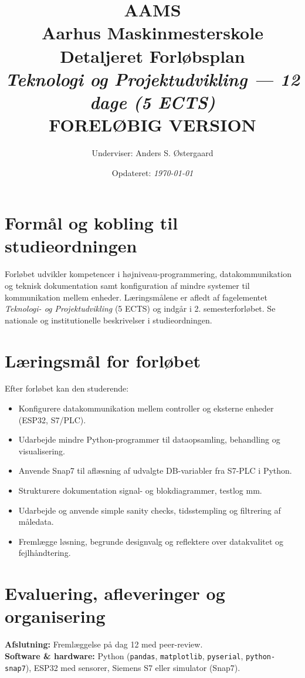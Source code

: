 \documentclass[a4paper,11pt]{article}
\title{\textbf{\Huge AAMS}\\[0.5cm]
       {\Large Aarhus Maskinmesterskole}\\[1cm]
       {\huge\color{blue!70!black}Detaljeret Forløbsplan}\\[0.3cm]
       {\Large\color{red!70!black}\textit{Teknologi og Projektudvikling — 12 dage (5 ECTS)}}\\[0.5cm]
       {\large\color{gray}\textbf{FORELØBIG VERSION}}}
\author{Underviser: Anders S. Østergaard}
\date{Opdateret: \emph{\today}}
\begin{document}
\maketitle

\tableofcontents
\clearpage

\section*{Formål og kobling til studieordningen}
Forløbet udvikler kompetencer i højniveau-programmering, datakommunikation og teknisk dokumentation samt konfiguration af mindre systemer til kommunikation mellem enheder. Læringsmålene er afledt af fagelementet \emph{Teknologi- og Projektudvikling} (5 ECTS) og indgår i 2. semesterforløbet. Se nationale og institutionelle beskrivelser i studieordningen.

\section*{Læringsmål for forløbet}
Efter forløbet kan den studerende:
\begin{itemize}
  \item Konfigurere datakommunikation mellem controller og eksterne enheder (ESP32, S7/PLC).
  \item Udarbejde mindre Python-programmer til dataopsamling, behandling og visualisering.
  \item Anvende Snap7 til aflæsning af udvalgte DB-variabler fra S7-PLC i Python.
  \item Strukturere dokumentation signal- og blokdiagrammer, testlog mm.
  \item Udarbejde og anvende simple sanity checks, tidsstempling og filtrering af måledata.
  \item Fremlægge løsning, begrunde designvalg og reflektere over datakvalitet og fejlhåndtering.
\end{itemize}

\section*{Evaluering, afleveringer og organisering}
\textbf{Afslutning:} Fremlæggelse på dag 12 med peer-review. \\
\textbf{Software \& hardware:} Python (\texttt{pandas}, \texttt{matplotlib}, \texttt{pyserial}, \texttt{python-snap7}), ESP32 med sensorer, Siemens S7 eller simulator (Snap7).

\clearpage
\end{document}
